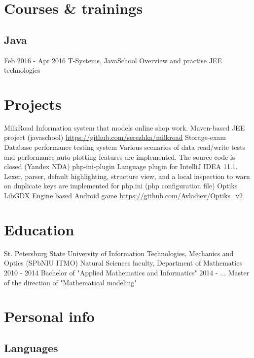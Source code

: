 \documentclass[11pt,a4paper,russian]{moderncv}
\begin{document}
\section{Courses \& trainings}    
\subsection{Java}
\cvline
  {Feb 2016 - Apr 2016}
  {T-Systems, JavaSchool \newline{}
  Overview and practise JEE technologies} 
    
\newpage

\section{Projects}
\cvline
  {MilkRoad}
  {Information system that models online shop work.\newline{} Maven-based JEE project (javaschool) \newline{}
  \url{https://github.com/serezhka/milkroad}}
\cvline
  {Storage-exam}
  {Database performance testing system\newline{} 
  Various scenarios of data read/write tests and performance auto plotting  \newline{}
  features are implemented. The source code is closed (Yandex NDA)}
\cvline
  {php-ini-plugin}
  {Language plugin for IntelliJ IDEA 11.1. \newline{} 
  Lexer, parser, default highlighting, structure view, and a local inspection to warn on duplicate keys are implemented for php.ini (php configuration file)}  
\cvline
  {Optiks}
  {LibGDX Engine based Android game\newline{}
  \url{https://github.com/Avladiev/Optiks_v2}}
  
\section{Education}
\cventry
  {}
  {\textnormal{St. Petersburg State University of Information Technologies, Mechanics and Optics (SPbNIU ITMO)}}
  {Natural Sciences faculty, Department of Mathematics}{}{}{}
\cvline
  {2010 - 2014}
  {Bachelor of "Applied Mathematics and Informatics"}
\cvline
  {2014 - ...}
  {Master of the direction of "Mathematical modeling"}

\section{Personal info}
\subsection{Languages}
\end{document}

